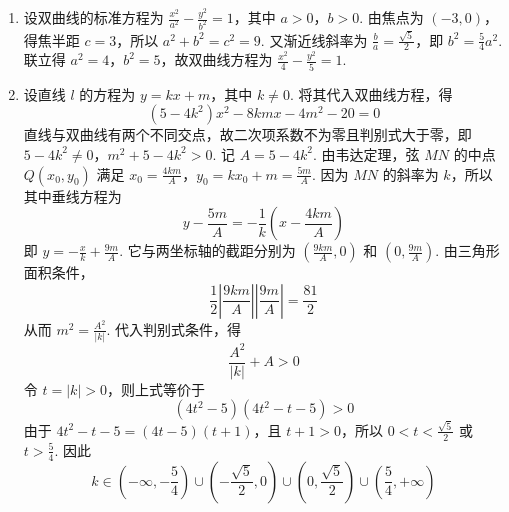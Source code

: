 \begin{solution}
\begin{enumerate}
\item 设双曲线的标准方程为 \(\frac{x^2}{a^2}-\frac{y^2}{b^2}=1\)，其中 \(a>0\)，\(b>0\). 由焦点为 \((-3,0)\)，得焦半距 \(c=3\)，所以 \(a^2+b^2=c^2=9\). 又渐近线斜率为 \(\frac{b}{a}=\frac{\sqrt{5}}{2}\)，即 \(b^2=\frac{5}{4}a^2\). 联立得 \(a^2=4\)，\(b^2=5\)，故双曲线方程为 \(\frac{x^2}{4}-\frac{y^2}{5}=1\).
\item 设直线 \(l\) 的方程为 \(y=kx+m\)，其中 \(k\ne0\). 将其代入双曲线方程，得
\[
(5-4k^2)x^2-8kmx-4m^2-20=0
\]
直线与双曲线有两个不同交点，故二次项系数不为零且判别式大于零，即
\(5-4k^2\ne0\)，\(m^2+5-4k^2>0\).
记 \(A=5-4k^2\). 由韦达定理，弦 \(MN\) 的中点 \(Q(x_0,y_0)\) 满足
\(x_0=\frac{4km}{A}\)，\(y_0=kx_0+m=\frac{5m}{A}\).
因为 \(MN\) 的斜率为 \(k\)，所以其中垂线方程为
\[
y-\frac{5m}{A}=-\frac{1}{k}\left(x-\frac{4km}{A}\right)
\]
即 \(y=-\frac{x}{k}+\frac{9m}{A}\). 它与两坐标轴的截距分别为 \(\left(\frac{9km}{A},0\right)\) 和 \(\left(0,\frac{9m}{A}\right)\). 由三角形面积条件，
\[
\frac{1}{2}\left|\frac{9km}{A}\right|\left|\frac{9m}{A}\right|=\frac{81}{2}
\]
从而 \(m^2=\frac{A^2}{|k|}\). 代入判别式条件，得
\[
\frac{A^2}{|k|}+A>0
\]
令 \(t=|k|>0\)，则上式等价于
\[
(4t^2-5)(4t^2-t-5)>0
\]
由于 \(4t^2-t-5=(4t-5)(t+1)\)，且 \(t+1>0\)，所以 \(0<t<\frac{\sqrt{5}}{2}\) 或 \(t>\frac{5}{4}\). 因此
\[
k\in\left(-\infty,-\frac{5}{4}\right)\cup\left(-\frac{\sqrt{5}}{2},0\right)\cup\left(0,\frac{\sqrt{5}}{2}\right)\cup\left(\frac{5}{4},+\infty\right)
\]
\end{enumerate}
\end{solution}
